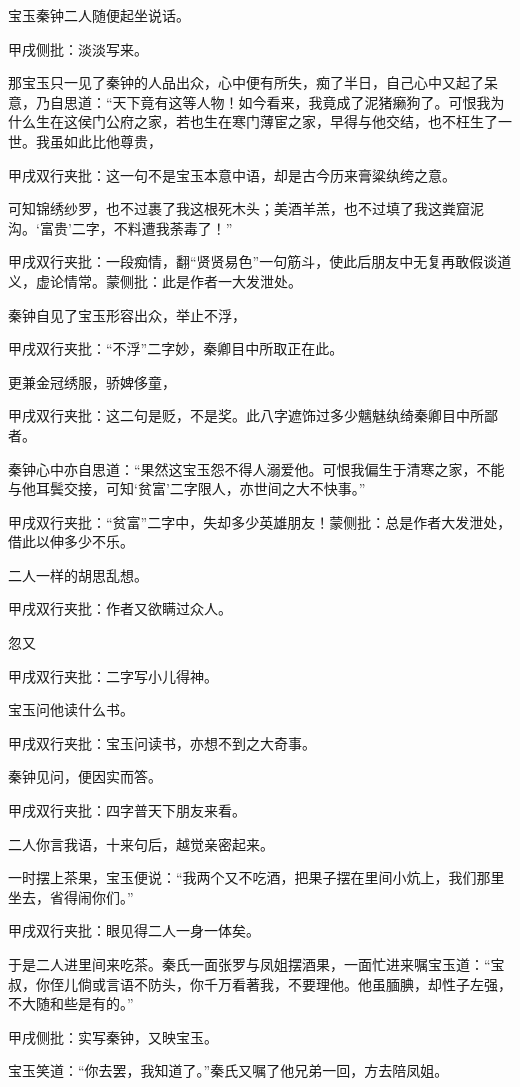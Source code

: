 \begin{parag}


    宝玉秦钟二人随便起坐说话。\begin{note}甲戌侧批：淡淡写来。\end{note}那宝玉只一见了秦钟的人品出众，心中便有所失，痴了半日，自己心中又起了呆意，乃自思道：“天下竟有这等人物！如今看来，我竟成了泥猪癞狗了。可恨我为什么生在这侯门公府之家，若也生在寒门薄宦之家，早得与他交结，也不枉生了一世。我虽如此比他尊贵，\begin{note}甲戌双行夹批：这一句不是宝玉本意中语，却是古今历来膏粱纨绔之意。\end{note}可知锦绣纱罗，也不过裹了我这根死木头；美酒羊羔，也不过填了我这粪窟泥沟。‘富贵’二字，不料遭我荼毒了！”\begin{note}甲戌双行夹批：一段痴情，翻“贤贤易色”一句筋斗，使此后朋友中无复再敢假谈道义，虚论情常。蒙侧批：此是作者一大发泄处。\end{note}秦钟自见了宝玉形容出众，举止不浮，\begin{note}甲戌双行夹批：“不浮”二字妙，秦卿目中所取正在此。\end{note}更兼金冠绣服，骄婢侈童，\begin{note}甲戌双行夹批：这二句是贬，不是奖。此八字遮饰过多少魑魅纨绮秦卿目中所鄙者。\end{note}秦钟心中亦自思道：“果然这宝玉怨不得人溺爱他。可恨我偏生于清寒之家，不能与他耳鬓交接，可知‘贫富’二字限人，亦世间之大不快事。”\begin{note}甲戌双行夹批：“贫富”二字中，失却多少英雄朋友！蒙侧批：总是作者大发泄处，借此以伸多少不乐。\end{note}二人一样的胡思乱想。\begin{note}甲戌双行夹批：作者又欲瞒过众人。\end{note}忽又\begin{note}甲戌双行夹批：二字写小儿得神。\end{note}宝玉问他读什么书。\begin{note}甲戌双行夹批：宝玉问读书，亦想不到之大奇事。\end{note}秦钟见问，便因实而答。\begin{note}甲戌双行夹批：四字普天下朋友来看。\end{note}二人你言我语，十来句后，越觉亲密起来。
\end{parag}


\begin{parag}


    一时摆上茶果，宝玉便说：“我两个又不吃酒，把果子摆在里间小炕上，我们那里坐去，省得闹你们。”\begin{note}甲戌双行夹批：眼见得二人一身一体矣。\end{note}于是二人进里间来吃茶。秦氏一面张罗与凤姐摆酒果，一面忙进来嘱宝玉道：“宝叔，你侄儿倘或言语不防头，你千万看著我，不要理他。他虽腼腆，却性子左强，不大随和些是有的。”\begin{note}甲戌侧批：实写秦钟，又映宝玉。\end{note}宝玉笑道：“你去罢，我知道了。”秦氏又嘱了他兄弟一回，方去陪凤姐。
\end{parag}



